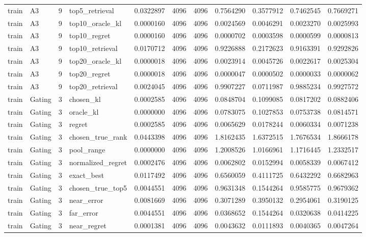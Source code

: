 \begin{tabular}{llrlrrrrrrr}
train & A3 & 9 & top5_retrieval & 0.0322897 & 4096 & 4096 & 0.7564290 & 0.3577912 & 0.7462545 & 0.7669271 \\
train & A3 & 9 & top10_oracle_kl & 0.0000160 & 4096 & 4096 & 0.0024569 & 0.0046291 & 0.0023270 & 0.0025993 \\
train & A3 & 9 & top10_regret & 0.0000160 & 4096 & 4096 & 0.0000702 & 0.0003598 & 0.0000599 & 0.0000813 \\
train & A3 & 9 & top10_retrieval & 0.0170712 & 4096 & 4096 & 0.9226888 & 0.2172623 & 0.9163391 & 0.9292826 \\
train & A3 & 9 & top20_oracle_kl & 0.0000018 & 4096 & 4096 & 0.0023914 & 0.0045726 & 0.0022617 & 0.0025304 \\
train & A3 & 9 & top20_regret & 0.0000018 & 4096 & 4096 & 0.0000047 & 0.0000502 & 0.0000033 & 0.0000062 \\
train & A3 & 9 & top20_retrieval & 0.0024045 & 4096 & 4096 & 0.9907227 & 0.0711987 & 0.9885234 & 0.9927572 \\
train & Gating & 3 & chosen_kl & 0.0002585 & 4096 & 4096 & 0.0848704 & 0.1099085 & 0.0817202 & 0.0882406 \\
train & Gating & 3 & oracle_kl & 0.0000000 & 4096 & 4096 & 0.0783075 & 0.1027853 & 0.0753738 & 0.0814571 \\
train & Gating & 3 & regret & 0.0002585 & 4096 & 4096 & 0.0065629 & 0.0178244 & 0.0060334 & 0.0071238 \\
train & Gating & 3 & chosen_true_rank & 0.0443398 & 4096 & 4096 & 1.8162435 & 1.6372515 & 1.7676534 & 1.8666178 \\
train & Gating & 3 & pool_range & 0.0000000 & 4096 & 4096 & 1.2008526 & 1.0166961 & 1.1716445 & 1.2332517 \\
train & Gating & 3 & normalized_regret & 0.0002476 & 4096 & 4096 & 0.0062802 & 0.0152994 & 0.0058339 & 0.0067412 \\
train & Gating & 3 & exact_best & 0.0117492 & 4096 & 4096 & 0.6560059 & 0.4111725 & 0.6432292 & 0.6682963 \\
train & Gating & 3 & chosen_true_top5 & 0.0044551 & 4096 & 4096 & 0.9631348 & 0.1544264 & 0.9585775 & 0.9679362 \\
train & Gating & 3 & near_error & 0.0081669 & 4096 & 4096 & 0.3071289 & 0.3950132 & 0.2954061 & 0.3190125 \\
train & Gating & 3 & far_error & 0.0044551 & 4096 & 4096 & 0.0368652 & 0.1544264 & 0.0320638 & 0.0414225 \\
train & Gating & 3 & near_regret & 0.0001381 & 4096 & 4096 & 0.0043632 & 0.0111893 & 0.0040365 & 0.0047264 \\

\end{tabular}
